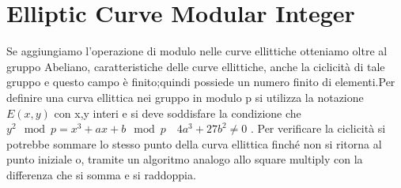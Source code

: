 \documentclass{book}
\begin{document}
\section{Elliptic Curve Modular Integer}
Se aggiungiamo l'operazione di modulo nelle curve ellittiche otteniamo oltre al gruppo Abeliano, caratteristiche delle curve ellittiche, anche la ciclicità di tale gruppo e questo campo è finito;quindi possiede un numero finito di elementi.Per definire una curva ellittica nei gruppo in modulo p si utilizza la notazione \(E(x,y)\) con x,y interi e si deve soddisfare la condizione che \(y^{2}\mod{p}=x^{3}+ax+b \mod{p}\quad 4a^{3}+27b^{2}\neq 0\) \@.\newline
Per verificare la ciclicità si potrebbe sommare lo stesso punto della curva ellittica finché non si ritorna al punto iniziale o, tramite un algoritmo analogo allo square multiply con la differenza che si somma e si raddoppia.
\end{document}
